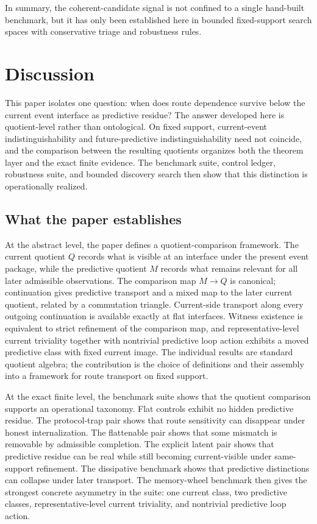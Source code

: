 \documentclass[11pt]{article}
\newcommand{\CurrentQ}{Q}
\newcommand{\PredictiveQ}{M}
\theoremstyle{definition}
\begin{document}
In summary, the coherent-candidate signal is not confined to a single hand-built benchmark, but it has only been established here in bounded fixed-support search spaces with conservative triage and robustness rules.

\section{Discussion}\label{sec:discussion}
This paper isolates one question: when does route dependence survive below the current event interface as predictive residue? The answer developed here is quotient-level rather than ontological. On fixed support, current-event indistinguishability and future-predictive indistinguishability need not coincide, and the comparison between the resulting quotients organizes both the theorem layer and the exact finite evidence. The benchmark suite, control ledger, robustness suite, and bounded discovery search then show that this distinction is operationally realized.

\subsection{What the paper establishes}\label{subsec:discussion-established}
At the abstract level, the paper defines a quotient-comparison framework. The current quotient $\CurrentQ$ records what is visible at an interface under the present event package, while the predictive quotient $\PredictiveQ$ records what remains relevant for all later admissible observations. The comparison map $\PredictiveQ \to \CurrentQ$ is canonical; continuation gives predictive transport and a mixed map to the later current quotient, related by a commutation triangle. Current-side transport along every outgoing continuation is available exactly at flat interfaces. Witness existence is equivalent to strict refinement of the comparison map, and representative-level current triviality together with nontrivial predictive loop action exhibits a moved predictive class with fixed current image. The individual results are standard quotient algebra; the contribution is the choice of definitions and their assembly into a framework for route transport on fixed support.

At the exact finite level, the benchmark suite shows that the quotient comparison supports an operational taxonomy. Flat controls exhibit no hidden predictive residue. The protocol-trap pair shows that route sensitivity can disappear under honest internalization. The flattenable pair shows that some mismatch is removable by admissible completion. The explicit latent pair shows that predictive residue can be real while still becoming current-visible under same-support refinement. The dissipative benchmark shows that predictive distinctions can collapse under later transport. The memory-wheel benchmark then gives the strongest concrete asymmetry in the suite: one current class, two predictive classes, representative-level current triviality, and nontrivial predictive loop action.
\end{document}

